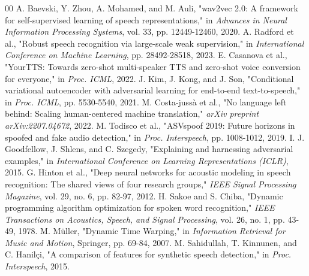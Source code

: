 \documentclass[conference]{IEEEtran}
\begin{document}
\begin{thebibliography}{00}
 A. Baevski, Y. Zhou, A. Mohamed, and M. Auli, "wav2vec 2.0: A framework for self-supervised learning of speech representations," in \textit{Advances in Neural Information Processing Systems}, vol. 33, pp. 12449-12460, 2020.
 A. Radford et al., "Robust speech recognition via large-scale weak supervision," in \textit{International Conference on Machine Learning}, pp. 28492-28518, 2023.
 E. Casanova et al., "YourTTS: Towards zero-shot multi-speaker TTS and zero-shot voice conversion for everyone," in \textit{Proc. ICML}, 2022.
 J. Kim, J. Kong, and J. Son, "Conditional variational autoencoder with adversarial learning for end-to-end text-to-speech," in \textit{Proc. ICML}, pp. 5530-5540, 2021.
 M. Costa-jussà et al., "No language left behind: Scaling human-centered machine translation," \textit{arXiv preprint arXiv:2207.04672}, 2022.
 M. Todisco et al., "ASVspoof 2019: Future horizons in spoofed and fake audio detection," in \textit{Proc. Interspeech}, pp. 1008-1012, 2019.
 I. J. Goodfellow, J. Shlens, and C. Szegedy, "Explaining and harnessing adversarial examples," in \textit{International Conference on Learning Representations (ICLR)}, 2015.
 G. Hinton et al., "Deep neural networks for acoustic modeling in speech recognition: The shared views of four research groups," \textit{IEEE Signal Processing Magazine}, vol. 29, no. 6, pp. 82-97, 2012.
 H. Sakoe and S. Chiba, "Dynamic programming algorithm optimization for spoken word recognition," \textit{IEEE Transactions on Acoustics, Speech, and Signal Processing}, vol. 26, no. 1, pp. 43-49, 1978.
 M. Müller, "Dynamic Time Warping," in \textit{Information Retrieval for Music and Motion}, Springer, pp. 69-84, 2007.
 M. Sahidullah, T. Kinnunen, and C. Hanilçi, "A comparison of features for synthetic speech detection," in \textit{Proc. Interspeech}, 2015.
\end{thebibliography}
\end{document}
